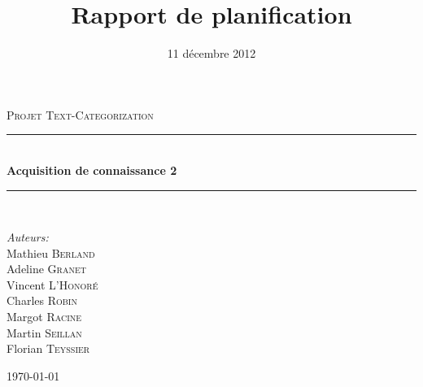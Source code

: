 \documentclass[a4paper]{article}
\title{Rapport de planification}
\date{11 décembre 2012}
\newcommand{\HRule}{\rule{\linewidth}{0.5mm}}
\begin{document}

\begin{titlepage}

\begin{center}



\textsc{\Large Projet Text-Categorization}\\[0.5cm]


\HRule \\[0.4cm]
{ \huge \bfseries Acquisition de connaissance 2}\\[0.4cm]

\HRule \\[1.5cm]

\begin{minipage}{0.4\textwidth}
\begin{flushleft} \large
\emph{Auteurs:}\\
Mathieu \textsc{Berland}\\
Adeline \textsc{Granet}\\
Vincent \textsc{L'Honoré}\\
Charles \textsc{Robin}\\
Margot \textsc{Racine}\\
Martin \textsc{Seillan}\\
Florian \textsc{Teyssier}\\
\end{flushleft}
\end{minipage}
\begin{minipage}{0.4\textwidth}
\begin{flushright} \large
\end{flushright}
\end{minipage}

\vfill

{\large \today}
\end{center}

\end{titlepage}






\tableofcontents
\newpage


\newpage
\end{document}

